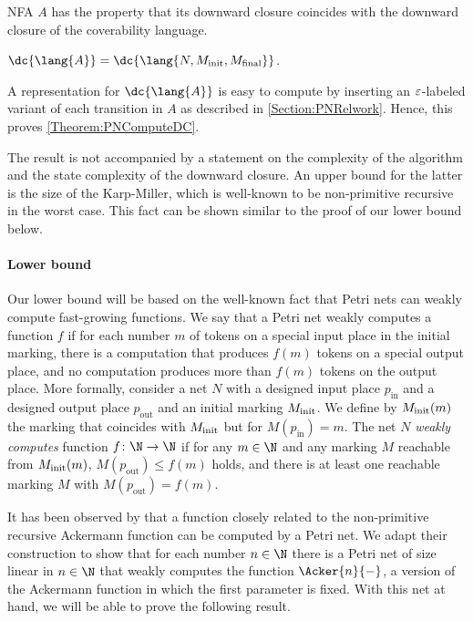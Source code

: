 \documentclass[../../diss.tex]{subfiles}
\begin{document}
NFA $A$ has the property that its downward closure coincides with the downward closure of the coverability language.

\begin{lemma}%
    $\dc{\lang{A}} = \dc{\lang{N,\Minit,\Mfinal}}$.
\end{lemma}

A representation for $\dc{\lang{A}}$ is easy to compute by inserting an $\varepsilon$-labeled variant of each transition in $A$ as described in \cref{Section:PNRelwork}.
Hence, this proves \cref{Theorem:PNComputeDC}.

The result is not accompanied by a statement on the complexity of the algorithm and the state complexity of the downward closure.
An upper bound for the latter is the size of the Karp-Miller, which is well-known to be non-primitive recursive in the worst case.
This fact can be shown similar to the proof of our lower bound below.

\paragraph{Lower bound}

Our lower bound will be based on the well-known fact that Petri nets can weakly compute fast-growing functions.
We say that a Petri net weakly computes a function $f$ if for each number $m$ of tokens on a special input place in the initial marking, there is a computation that produces $f(m)$ tokens on a special output place, and no computation produces more than $f(m)$ tokens on the output place.
More formally, consider a net $N$ with a designed input place $p_{\text{in}}$ and a designed output place $p_{\text{out}}$ and an initial marking $M_{\text{init}}$.
We define by $M_{\text{init}}(m)$ the marking that coincides with $M_{\text{init}}$ but for $M(p_{\text{in}}) = m$.
The net $N$ \emph{weakly computes} function $f \colon \N \to \N$ if for any $m \in \N$ and any marking $M$ reachable from $M_{\text{init}}(m)$, $M(p_{\text{out}}) \leq f(m)$ holds, and there is at least one reachable marking $M$ with $M(p_{\text{out}}) = f(m)$.

It has been observed by  that a function closely related to the non-primitive recursive Ackermann function can be computed by a Petri net.
We adapt their construction to show that for each number $n \in \N$ there is a Petri net of size linear in $n \in \N$ that weakly computes the function $\Acker{n}{-}$, \ie a version of the Ackermann function in which the first parameter is fixed.
With this net at hand, we will be able to prove the following result.
\end{document}
